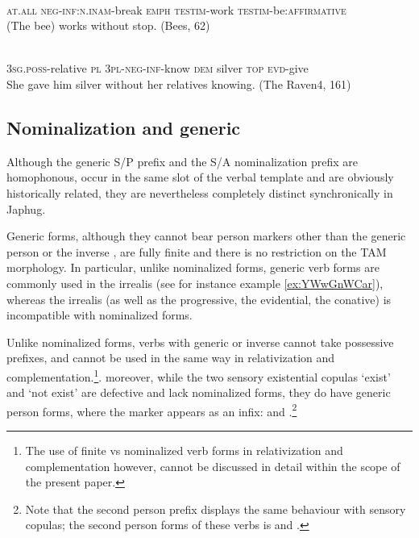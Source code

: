\begin{exe}
\ex \label{ex:mAkWmbrAt}
\gll
{} 	 	 	 	  \\
\textsc{at.all} \textsc{neg-inf:n.inam}-break \textsc{emph} \textsc{testim}-work \textsc{testim}-be:\textsc{affirmative} \\
\glt (The bee) works without stop. (Bees, 62)
 \end{exe}
 
 \begin{exe}
\ex \label{ex:nWmAkAsWz}
\gll
{}   	   	   	   	   	   	   \\
\textsc{3sg.poss}-relative \textsc{pl} \textsc{3pl-neg-inf}-know \textsc{dem} silver \textsc{top} \textsc{evd}-give \\
\glt  She gave him silver without her relatives knowing. (The Raven4, 161)
\end{exe}


 \subsection{Nominalization and generic}  
Although the generic S/P  prefix and the S/A nominalization  prefix are homophonous, occur in the same slot of the verbal template and are obviously historically related, they are nevertheless completely distinct synchronically in Japhug. 

Generic forms, although they cannot bear person markers other than the generic  person  or the inverse , are fully finite and there is no restriction on the TAM morphology. In particular, unlike nominalized forms, generic verb forms are commonly used in the irrealis (see for instance example \ref{ex:YWwGnWCar}), whereas the irrealis (as well as the progressive, the evidential, the conative) is incompatible with  nominalized forms.

Unlike nominalized forms,  verbs with generic  or   inverse  cannot take possessive prefixes, and cannot be used in the same way in relativization and complementation.\footnote{The use of finite vs nominalized verb forms in relativization and complementation however, cannot be discussed in detail within the scope of the present paper.}. moreover, while the  two sensory existential copulas  `exist' and  `not exist'  are defective and lack nominalized forms, they do have generic person forms, where the marker    appears  as an infix:  and .\footnote{Note that the second person prefix  displays the same behaviour with sensory copulas; the second person forms of these verbs is  and . } 

